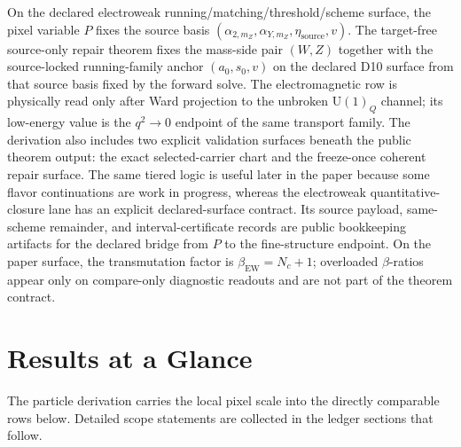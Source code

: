 \documentclass[11pt]{article}
\newcommand{\U}{\mathrm{U}}
\begin{document}
On the declared electroweak running/matching/threshold/scheme surface, the pixel variable \(P\) fixes the
source basis
\((\alpha_{2,m_Z},\alpha_{Y,m_Z},\eta_{\mathrm{source}},v)\). The target-free
source-only repair theorem fixes the mass-side pair \((W,Z)\) together with the source-locked
running-family anchor \((a_0,s_0,v)\) on the declared D10 surface from that source basis fixed by the forward solve. The
electromagnetic row is physically read only after Ward projection to the unbroken \(\U(1)_Q\)
channel; its low-energy value is the \(q^2\to0\) endpoint of the same transport family. The
derivation also includes two explicit validation surfaces beneath the public theorem output: the
exact selected-carrier chart and the freeze-once coherent repair surface. The same tiered logic is
useful later in the paper because some flavor continuations are work in progress, whereas the
electroweak quantitative-closure lane has an explicit declared-surface contract. Its source
payload, same-scheme remainder, and interval-certificate records are public bookkeeping artifacts
for the declared bridge from \(P\) to the fine-structure endpoint.
On the paper surface, the transmutation factor is \(\beta_{\mathrm{EW}}=N_c+1\); overloaded \(\beta\)-ratios appear only on compare-only diagnostic readouts and are not part of the theorem contract.

\section{Results at a Glance}

The particle derivation carries the local pixel scale into the directly comparable rows below.
Detailed scope statements are collected in the ledger sections that follow.
\end{document}
